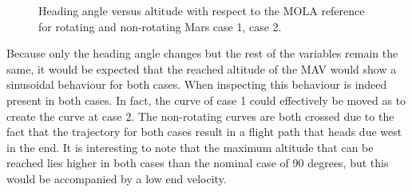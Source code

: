 \begin{figure}[H]
\centering
{} 
\caption{Heading angle versus altitude with respect to the \ac{MOLA} reference for rotating and non-rotating Mars \protect{} case 1,  \protect{} case 2. } 
\label{fig:headingAngleVsAltitudeCase1combined} 
\end{figure}

\noindent
Because only the heading angle changes but the rest of the variables remain the same, it would be expected that the reached altitude of the \ac{MAV} would show a sinusoidal behaviour for both cases. When inspecting  this behaviour is indeed present in both cases. In fact, the curve of case 1 could effectively be moved as to create the curve at case 2. The non-rotating curves are both crossed due to the fact that the trajectory for both cases result in a flight path that heads due west in the end. It is interesting to note that the maximum altitude that can be reached lies higher in both cases than the nominal case of 90 degrees, but this would be accompanied by a low end velocity.


